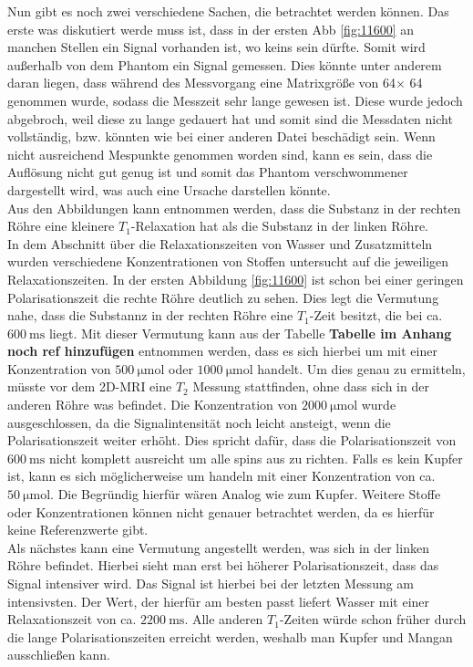 Nun gibt es noch zwei verschiedene Sachen, die betrachtet werden können. Das erste was diskutiert werde muss ist, dass in der ersten Abb \ref{fig:11600} an manchen Stellen ein Signal vorhanden ist, wo keins sein dürfte. Somit wird außerhalb von dem Phantom ein Signal gemessen. Dies könnte unter anderem daran liegen, dass während des Messvorgang eine Matrixgröße von 64$\times$ 64 genommen wurde, sodass die Messzeit sehr lange gewesen ist. Diese wurde jedoch abgebroch, weil diese zu lange gedauert hat und somit sind die Messdaten nicht vollständig, bzw. könnten wie bei einer anderen Datei beschädigt sein. Wenn nicht ausreichend Mespunkte genommen worden sind, kann es sein, dass die Auflösung nicht gut genug ist und somit das Phantom verschwommener dargestellt wird, was auch eine Ursache darstellen könnte.\\
Aus den Abbildungen kann entnommen werden, dass die Substanz in der rechten Röhre eine kleinere $T_1$-Relaxation hat als die Substanz in der linken Röhre.\\
In dem Abschnitt über die \glqq Relaxationszeiten von Wasser und Zusatzmitteln\grqq \, wurden verschiedene Konzentrationen von Stoffen untersucht auf die jeweiligen Relaxationszeiten. In der ersten Abbildung \ref{fig:11600} ist schon bei einer geringen Polarisationszeit die rechte Röhre deutlich zu sehen. Dies legt die Vermutung nahe, dass die Substannz in der  rechten Röhre eine $T_1$-Zeit besitzt, die bei ca. $\SI{600}{\milli\second}$ liegt. Mit dieser Vermutung kann aus der Tabelle \textbf{Tabelle im Anhang noch ref hinzufügen} entnommen werden, dass es sich hierbei um  mit einer Konzentration von $\SI{500}{\micro\mole}$ oder 
$\SI{1000}{\micro\mole}$ handelt. Um dies genau zu ermitteln, müsste vor dem 2D-MRI 
eine $T_2$ Messung stattfinden, ohne dass sich in der anderen Röhre was befindet. Die Konzentration von $\SI{2000}{\micro\mole}$ wurde ausgeschlossen, da die Signalintensität noch leicht ansteigt, wenn die Polarisationszeit weiter erhöht. Dies spricht dafür, dass die Polarisationszeit von $\SI{600}{\milli\second}$ nicht komplett ausreicht um alle spins aus zu richten. Falls es kein Kupfer ist, kann es sich möglicherweise um  handeln mit einer Konzentration von ca. $\SI{50}{\micro\mole}$. Die Begründig hierfür wären Analog wie zum Kupfer. Weitere Stoffe oder Konzentrationen können nicht genauer betrachtet werden, da es hierfür keine Referenzwerte gibt.\\
Als nächstes kann eine Vermutung angestellt werden, was sich in der linken Röhre befindet. Hierbei sieht man erst bei höherer Polarisationszeit, dass das Signal intensiver wird. Das Signal ist hierbei bei der letzten Messung am intensivsten. Der Wert, der hierfür am besten passt liefert Wasser mit einer Relaxationszeit von ca. $\SI{2200}{\milli\second}$. Alle anderen $T_1$-Zeiten würde schon früher durch die lange Polarisationszeiten erreicht werden, weshalb man Kupfer und Mangan ausschließen kann.\\



